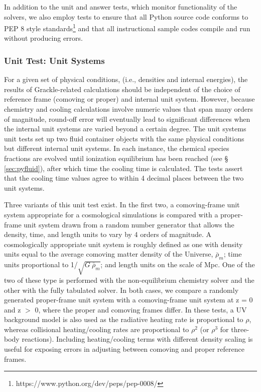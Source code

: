 In addition to the unit and answer tests, which monitor functionality
of the solvers, we also employ tests to ensure that all Python source
code conforms to PEP 8 style
standards\footnote{https://www.python.org/dev/peps/pep-0008/} and that
all instructional sample codes compile and run without producing
errors.

\subsubsection{Unit Test: Unit Systems}
\label{sec:test-units}

For a given set of physical conditions, (i.e., densities and internal
energies), the results of Grackle-related calculations should be
independent of the choice of reference frame (comoving or proper) and
internal unit system.  However, because chemistry and cooling
calculations involve numeric values that span many orders of
magnitude, round-off error will eventually lead to significant
differences when the internal unit systems are varied beyond a certain
degree.  The unit systems unit tests set up two fluid container
objects with the same physical conditions but different internal unit
systems.  In each instance, the chemical species fractions are evolved
until ionization equilibrium has been reached (see \S
\ref{sec:pyfluid}), after which time the cooling time is calculated.
The tests assert that the cooling time values agree to within 4
decimal places between the two unit systems.

Three variants of this unit test exist.  In the first two, a
comoving-frame unit system appropriate for a cosmological simulations
is compared with a proper-frame unit system drawn from a random number
generator that allows the density, time, and length units to vary by 4
orders of magnitude.  A cosmologically appropriate unit system is
roughly defined as one with density units equal to the average
comoving matter density of the Universe, $\bar{\rho}_{m}$; time units
proportional to 1/$\sqrt{G\ \bar{\rho}_{m}}$; and length units on the
scale of Mpc.  One of the two of these type is performed with the
non-equilibrium chemistry solver and the other with the fully
tabulated solver.  In both cases, we compare a randomly generated
proper-frame unit system with a comoving-frame unit system at z = 0
and z $>$ 0, where the proper and comoving frames differ.  In these
tests, a UV background model is also used as the radiative heating
rate is proportional to $\rho$, whereas collisional heating/cooling
rates are proportional to $\rho^{2}$ (or $\rho^{3}$ for three-body
reactions).  Including heating/cooling terms with different density
scaling is useful for exposing errors in adjusting between comoving
and proper reference frames.

